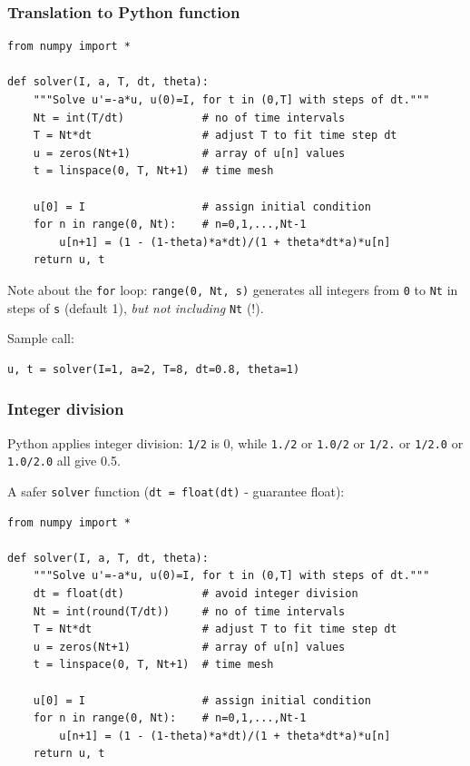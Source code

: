 \documentclass{beamer}
\begin{document}
\begin{frame}
\frametitle{Translation to Python function}

\begin{verbatim}
from numpy import *

def solver(I, a, T, dt, theta):
    """Solve u'=-a*u, u(0)=I, for t in (0,T] with steps of dt."""
    Nt = int(T/dt)            # no of time intervals
    T = Nt*dt                 # adjust T to fit time step dt
    u = zeros(Nt+1)           # array of u[n] values
    t = linspace(0, T, Nt+1)  # time mesh

    u[0] = I                  # assign initial condition
    for n in range(0, Nt):    # n=0,1,...,Nt-1
        u[n+1] = (1 - (1-theta)*a*dt)/(1 + theta*dt*a)*u[n]
    return u, t
\end{verbatim}

Note about the \texttt{for} loop: \texttt{range(0, Nt, s)} generates all integers
from \texttt{0} to \texttt{Nt} in steps of \texttt{s} (default 1), \emph{but not including} \texttt{Nt} (!).

Sample call:
\begin{verbatim}
u, t = solver(I=1, a=2, T=8, dt=0.8, theta=1)
\end{verbatim}
\end{frame}

\begin{frame}
\frametitle{Integer division}

Python applies integer division: \texttt{1/2} is 0, while \texttt{1./2} or \texttt{1.0/2} or
\texttt{1/2.} or \texttt{1/2.0} or \texttt{1.0/2.0} all give 0.5.

A safer \texttt{solver} function (\texttt{dt = float(dt)} - guarantee float):

\begin{verbatim}
from numpy import *

def solver(I, a, T, dt, theta):
    """Solve u'=-a*u, u(0)=I, for t in (0,T] with steps of dt."""
    dt = float(dt)            # avoid integer division
    Nt = int(round(T/dt))     # no of time intervals
    T = Nt*dt                 # adjust T to fit time step dt
    u = zeros(Nt+1)           # array of u[n] values
    t = linspace(0, T, Nt+1)  # time mesh

    u[0] = I                  # assign initial condition
    for n in range(0, Nt):    # n=0,1,...,Nt-1
        u[n+1] = (1 - (1-theta)*a*dt)/(1 + theta*dt*a)*u[n]
    return u, t
\end{verbatim}
\end{frame}
\end{document}
